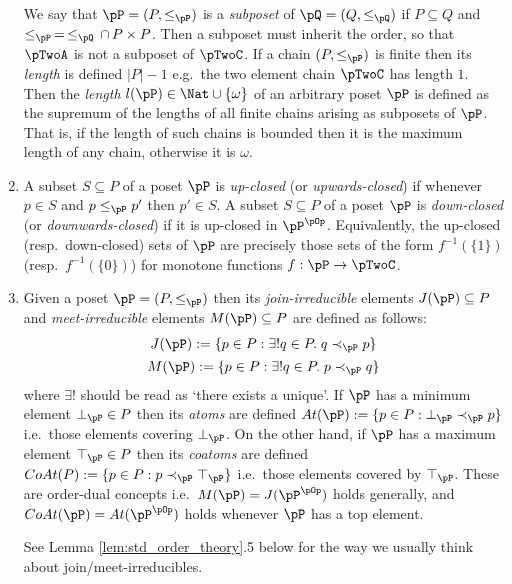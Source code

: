 \documentclass{article}
\begin{document}
\begin{definition}
\begin{enumerate}
We say that $\pP = (P,\leq_\pP)$ is a \emph{subposet} of $\pQ = (Q,\leq_\pQ)$ if $P \subseteq Q$ and $\leq_\pP \, = \, \leq_\pQ \, \cap \, P \times P$. Then a subposet must inherit the order, so that $\pTwoA$ is not a subposet of $\pTwoC$. If a chain $(P,\leq_\pP)$ is finite then its \emph{length} is defined $|P| - 1$ e.g.\ the two element chain $\pTwoC$ has length $1$. Then the \emph{length} $l(\pP) \in \Nat \cup \{\omega \}$ of an arbitrary poset $\pP$ is defined as the supremum of the lengths of all finite chains arising as subposets of $\pP$. That is, if the length of such chains is bounded then it is the maximum length of any chain, otherwise it is $\omega$.

\item
A subset $S \subseteq P$ of a poset $\pP$ is \emph{up-closed} (or \emph{upwards-closed}) if whenever $p \in S$ and $p \leq_\pP p'$ then $p' \in S$. A subset $S \subseteq P$ of a poset $\pP$ is \emph{down-closed} (or \emph{downwards-closed}) if it is up-closed in $\pP^{\pOp}$. Equivalently, the up-closed (resp.\ down-closed) sets of $\pP$ are precisely those sets of the form $f^{-1}(\{1\})$ (resp.\ $f^{-1}(\{0\})$) for monotone functions $f : \pP \to \pTwoC$. 

\item
Given a poset $\pP = (P,\leq_\pP)$ then its \emph{join-irreducible} elements $J(\pP) \subseteq P$ and \emph{meet-irreducible} elements $M(\pP) \subseteq P$ are defined as follows:
\[
\begin{tabular}{c}
$J(\pP) := \{ p \in P : \exists! q \in P. \; q \prec_\pP p \}$
\\[1ex]
$M(\pP) := \{ p \in P : \exists! q \in P. \; p \prec_\pP q  \}$
\end{tabular}
\]
where $\exists!$ should be read as `there exists a unique'. If $\pP$ has a minimum element $\bot_\pP \in P$ then its \emph{atoms} are defined $At(\pP) := \{ p \in P : \bot_\pP \prec_\pP p \}$ i.e.\ those elements covering $\bot_\pP$. On the other hand, if $\pP$ has a maximum element $\top_\pP \in P$ then its \emph{coatoms} are defined $CoAt(P) := \{ p \in P : p \prec_\pP \top_\pP \}$ i.e.\ those elements covered by $\top_\pP$. These are order-dual concepts i.e.\ $M(\pP) = J(\pP^{\pOp})$ holds generally, and $CoAt(\pP) = At(\pP^{\pOp})$ holds whenever $\pP$ has a top element. 

See Lemma \ref{lem:std_order_theory}.5 below for the way we usually think about join/meet-irreducibles.


\end{enumerate}
\end{definition}
\end{document}
